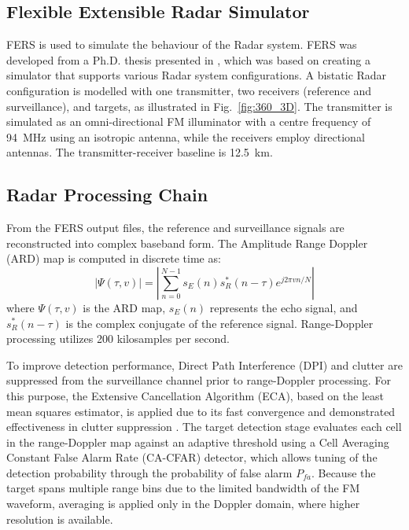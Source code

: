 \documentclass[conference,10pt,a4paper]{IEEEtran}%
\begin{document}
\subsection{Flexible Extensible Radar Simulator}

FERS is used to simulate the behaviour of the Radar system. FERS was developed from a Ph.D. thesis presented in \cite{fersMarc}, which was based on creating a simulator that supports various Radar system configurations. A bistatic Radar configuration is modelled with one transmitter, two receivers (reference and surveillance), and targets, as illustrated in Fig.~\ref{fig:360_3D}. The transmitter is simulated as an omni-directional FM illuminator with a centre frequency of 94~MHz using an isotropic antenna, while the receivers employ directional antennas. The transmitter-receiver
baseline is 12.5~km.                                                                           
\subsection{Radar Processing Chain}                                                                        
From the FERS output files, the reference and surveillance signals are reconstructed into complex baseband form. The Amplitude Range Doppler (ARD) map is computed in discrete time as:
\begin{equation}                                                         
  \left| \Psi(\tau, v) \right| = \left| \sum_{n=0}^{N-1} s_E(n) s_R^*(n-\tau) e^{j 2\pi v n/N} \right|                                                 
\end{equation}                                                                                                                                           
where $\Psi(\tau, v)$ is the ARD map, $s_E(n)$ represents the echo signal, and $s_R^*(n-\tau)$ is the complex conjugate of the reference signal. Range-Doppler processing utilizes 200 kilosamples per second.                                                                                            

To improve detection performance, Direct Path Interference (DPI) and clutter are suppressed from the surveillance channel prior to range-Doppler processing. For this purpose, the Extensive Cancellation Algorithm (ECA), based on the least mean squares estimator, is applied due to its fast convergence and demonstrated effectiveness in clutter suppression \cite{coloneECA}. The target detection stage evaluates each cell in the range-Doppler map against an adaptive threshold using a Cell Averaging Constant False Alarm Rate (CA-CFAR) detector, which allows tuning of the detection probability through the probability of false alarm $P_{fa}$. Because the target spans multiple range bins due to the limited bandwidth of the FM waveform, averaging is applied only in the Doppler domain, where higher resolution is available.       
              
\end{document}
